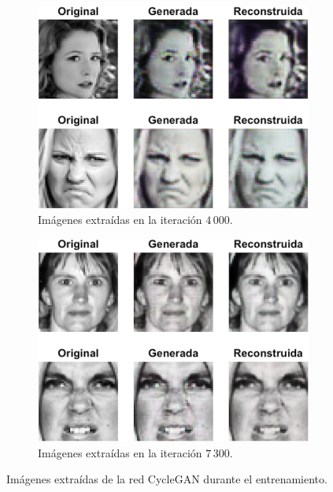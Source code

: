 \begin{figure}
    \vspace{1cm}
    \begin{subfigure}[t]{.45\textwidth}
      \centering
      \includegraphics[width=\linewidth]{Images/CycleGAN_4000.png}
      \caption{Imágenes extraídas en la iteración $4\,000$.}
      \label{fig:CycleGAN_4000}
    \end{subfigure}
    \hfill
    \begin{subfigure}[t]{.45\textwidth}
      \centering
      \includegraphics[width=\linewidth]{Images/CycleGAN_7300.png}
      \caption{Imágenes extraídas en la iteración $7\,300$.}
      \label{fig:CycleGAN_7300}
    \end{subfigure}
    \caption{Imágenes extraídas de la red CycleGAN durante el entrenamiento.}
    \label{fig:CycleGAN_images}
\end{figure}

